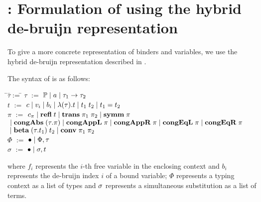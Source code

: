 \documentclass[10pt]{article}
\begin{document}
\section{\STLCD: Formulation of \STLCE using the hybrid de-bruijn representation}

To give a more concrete representation of binders and variables, we
use the hybrid de-bruijn representation described in
\cite{stampoulis12}. 

\begin{mydef}[Syntax]\label{def:stlcd-syntax}
The syntax of \STLCD is as follows:
%
\begin{tabbing}
\qquad\=$\tau$\quad\=$:=$\quad\=\kill
\>$\tau$  \>$:=$  \>$\mathbb{P} \; | \; a \; | \; \tau_1 \to \tau_2$\\
\>$t$     \>$:=$  \>$c \; | \; v_i \; | \; b_i \; | \; \lambda{(\tau)}.{t} \; | \; t_1\; t_2 \; | \; t_1 = t_2$\\
\>$\pi$   \>$:=$  \>$c_\pi \; | \; \mbox{\bf refl}\; t \; | \; \mbox{\bf trans}\;\pi_1\; \pi_2 \; | \; \mbox{\bf symm}\; \pi$\\
\>\>\>$\; | \; \mbox{\bf congAbs}\;(\tau.\pi) \; | \; \mbox{\bf congAppL}\;\pi \; | \; \mbox{\bf congAppR}\;\pi 
       \; | \; \mbox{\bf congEqL}\;\pi \; | \; \mbox{\bf congEqR}\;\pi$\\
\>\>\>$\; | \; \mbox{\bf beta}\;(\tau.t_1)\; t_2 \; | \; \mbox{\bf conv}\; \pi_1\; \pi_2$\\
\>$\Phi$  \>$:=$ \>$\bullet \; | \; \Phi, \tau$\\
\>$\sigma$  \>$:=$ \>$\bullet \; | \; \sigma, t$
\end{tabbing}
%
where $f_i$ represents the $i$-th free variable in the enclosing
context and $b_i$ represents the de-bruijn index $i$ of a bound
variable; $\Phi$ represents a typing context as a list of types and
$\sigma$ represents a simultaneous substitution as a list of terms.
\end{mydef}
\end{document}
